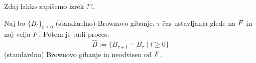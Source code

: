 \documentclass[11pt]{article}
\begin{document}
    Zdaj lahko zapišemo izrek ??. %
    
    
    \begin{izrek}
        Naj bo \(\{B_t\}_{t \geq 0}\) (standardno) Brownovo gibanje, \(\tau\) čas ustavljanja glede na
        \({F}\) in naj velja \({F}\).
        Potem je tudi proces:
        \[
        \hat{B} := \{B_{\tau+t} - B_\tau \mid t \geq 0\}
        \]
        (standardno) Brownovo gibanje in neodvisen od \({F}\).
    \end{izrek}
    
    
    
\end{document}
